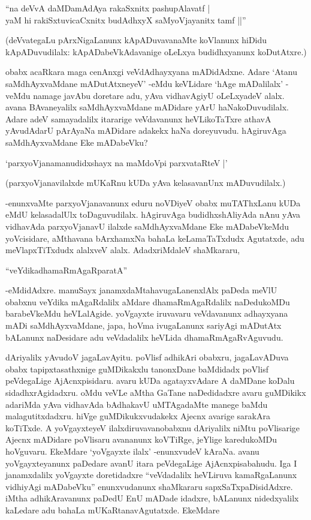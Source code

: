 \begin{shloka}
``na deVvA daMDamAdAya rakaSxnitx pashupAlavatf |\\
yaM hi rakiSxtuvicaCxnitx budAdhxyX saMyoVjayanitx tamf ||''
\end{shloka}

(deVvategaLu pArxNigaLanunx kApADuvavanaMte koVlanunx hiDidu kApADuvudilalx: kApADabeVkAdavanige oLeLxya budidhxyanunx koDutAtxre.)


obabx acaRkara maga cenAnxgi veVdAdhayxyana mADidAdxne. Adare `Atanu saMdhAyxvaMdane mADutAtxneyeV' -eMdu keVLidare `hAge mADalilalx' -veMdu namage javAbu doretare adu, yAva vidhavAgiyU oLeLxyadeV alalx. avana BAvaneyalilx saMdhAyxvaMdane mADidare yArU haNakoDuvudilalx. Adare adeV samayadalilx itararige veVdavanunx heVLikoTaTxre athavA yAvudAdarU pArAyaNa mADidare adakekx haNa doreyuvudu. hAgiruvAga saMdhAyxvaMdane Eke mADabeVku?

\begin{shloka}
`parxyoVjanamanudidxshayx na maMdoV\s pi parxvataRteV |'
\end{shloka}

(parxyoVjanavilalxde mUKaRnu kUDa yAva kelasavanUnx mADuvudilalx.)

-enunxvaMte parxyoVjanavanunx eduru noVDiyeV obabx muTAThxLanu kUDa eMdU kelasadalUlx toDaguvudilalx. hAgiruvAga budidhxshAliyAda nAnu yAva vidhavAda parxyoVjanavU ilalxde saMdhAyxvaMdane Eke mADabeVkeMdu yoVcisidare, aMthavana bArxhamxNa bahaLa keLamaTaTxdudx Agutatxde, adu meVlapxTiTxdudx alalxveV alalx. AdadxriMdaleV shaMkararu,

\begin{shloka}
``veYdikadhamaRmAgaRparatA''
\end{shloka}

-eMdidAdxre. manuSayx janamxdaMtahavugaLanenxlAlx paDeda meVlU obabxnu veYdika mAgaRdalilx aMdare dhamaRmAgaRdalilx naDedukoMDu barabeVkeMdu heVLalAgide. yoVgayxte iruvavaru veVdavanunx adhayxyana mADi saMdhAyxvaMdane, japa, hoVma ivugaLanunx sariyAgi mADutAtx bALanunx naDesidare adu veVdadalilx heVLida dhamaRmAgaRvAguvudu.

dAriyalilx yAvudoV jagaLavAyitu. poVlisf adhikAri obabxru, jagaLavADuva obabx tapipxtasathxnige guMDikakxlu tanonxDane baMdidadx poVlisf peVdegaLige AjAcnxpisidaru. avaru kUDa agatayxvAdare A daMDane koDalu sidadhxrAgidadxru. oMdu veVLe aMtha GaTane naDedidadxre avaru guMDikikx adariMda yAva vidhavAda bAdhakavU uMTAgadaMte manege baMdu malagutitxdadxru. hiVge guMDikukxvudakekx Ajecnx avarige sarakAra koTiTxde. A yoVgayxteyeV ilalxdiruvavanobabxnu dAriyalilx niMtu poVlisarige Ajecnx mADidare poVlisaru avananunx koVTiRge, jeYlige karedukoMDu hoVguvaru. EkeMdare `yoVgayxte ilalx' -enunxvudeV kAraNa. avanu yoVgayxteyanunx paDedare avanU itara peVdegaLige AjAcnxpisabahudu. Iga I janamxdalilx yoVgayxte doretidadxre ``veVdadalilx heVLiruva kamaRgaLanunx vidhiyAgi mADabeVku'' enunxvudanunx shaMkararu sapxSaTxpaDisidAdxre. iMtha adhikAravanunx paDedU EnU mADade idadxre, bALanunx nidedxyalilx kaLedare adu bahaLa mUKaRtanavAgutatxde. EkeMdare

